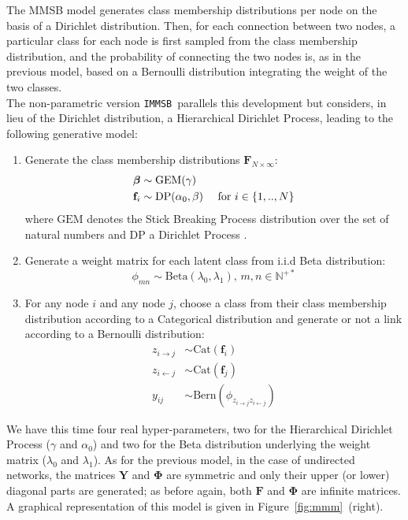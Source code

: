 \documentclass[journal]{IEEEtran}
\renewcommand{\text}{\textnormal}
\newcommand{\imb}{\texttt{IMMSB}}
\newcommand{\gem}{\mathrm{GEM}}
\newcommand{\DP}{\mathrm{DP}}
\newcommand{\mat}[1]{\mathbf{#1}}
\begin{document}
The MMSB model generates class membership distributions per node on the basis of a Dirichlet distribution. Then, for each connection between two nodes, a particular class for each node is first sampled from the class membership distribution, and the probability of connecting the two nodes is, as in the previous model, based on a Bernoulli distribution integrating the weight of the two classes. 
~\\
The non-parametric version \imb\ parallels this development but considers, in lieu of the Dirichlet distribution, a Hierarchical Dirichlet Process, leading to the following generative model:
%
\begin{enumerate}
\item Generate the class membership distributions $\mat{F}_{N \times \infty}$:
   \begin{align}
       \bm{\beta} &\sim \gem(\gamma) \nonumber \\
    \mat{f}_i &\sim \DP(\alpha_0, \beta) \quad\text{ for }  i \in \{1, .., N\} \nonumber
   \end{align}
where $\gem$ denotes the Stick Breaking Process distribution over the set of natural numbers and $\DP$ a Dirichlet Process  \cite{HDP}.
\item Generate a weight matrix for each latent class from i.i.d Beta distribution:\\
\[ \phi_{mn} \sim \mathrm{Beta}(\lambda_0,\lambda_1), \, m,n \in \mathbb{N}^{+*} \]
\item For any node $i$ and any node $j$, choose a class from their class membership distribution according to a Categorical distribution and generate or not a link according to a Bernoulli distribution:
   \begin{align}
    z_{i \rightarrow j} &\sim \mbox{Cat}(\mat{f}_i) \nonumber \\
    z_{i \leftarrow j} &\sim \mbox{Cat}(\mat{f}_j) \nonumber \\
    y_{ij} &\sim \mathrm{Bern}(\phi_{z_{i \rightarrow j}z_{i \leftarrow j}})
    \label{eq:link-immsb}
   \end{align}
\end{enumerate}
%
We have this time four real hyper-parameters, two for the Hierarchical Dirichlet Process ($\gamma$ and $\alpha_0$) and two for the Beta distribution underlying the weight matrix ($\lambda_0$ and $\lambda_1$). As for the previous model, in the case of undirected networks, the matrices $\mat{Y}$ and $\mat{\Phi}$ are symmetric and only their upper (or lower) diagonal parts are generated; as before again, both $\mat{F}$ and $\mat{\Phi}$ are infinite matrices. A graphical representation of this model is given in Figure~\ref{fig:mmm}~(right).
\end{document}
